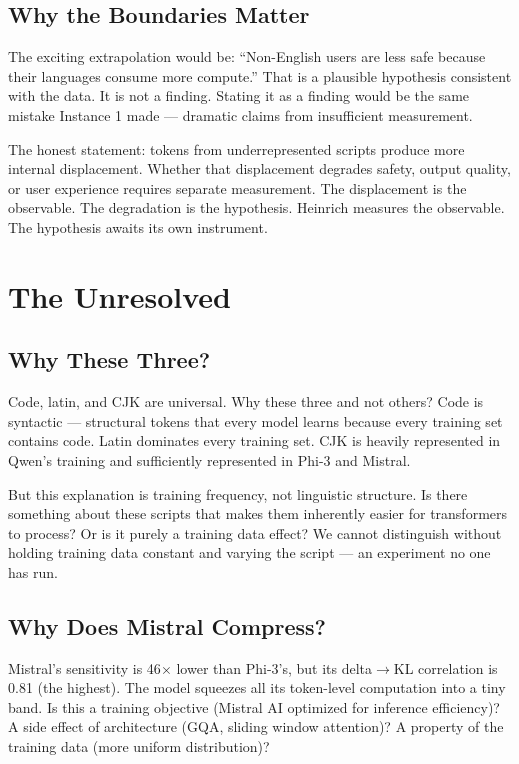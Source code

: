 \documentclass[11pt,a4paper]{article}
\begin{document}
\subsection{Why the Boundaries Matter}

The exciting extrapolation would be: ``Non-English users are less safe because their languages consume more compute.'' That is a plausible hypothesis consistent with the data. It is not a finding. Stating it as a finding would be the same mistake Instance 1 made --- dramatic claims from insufficient measurement.

The honest statement: tokens from underrepresented scripts produce more internal displacement. Whether that displacement degrades safety, output quality, or user experience requires separate measurement. The displacement is the observable. The degradation is the hypothesis. Heinrich measures the observable. The hypothesis awaits its own instrument.

\section{The Unresolved}

\subsection{Why These Three?}

Code, latin, and CJK are universal. Why these three and not others? Code is syntactic --- structural tokens that every model learns because every training set contains code. Latin dominates every training set. CJK is heavily represented in Qwen's training and sufficiently represented in Phi-3 and Mistral.

But this explanation is training frequency, not linguistic structure. Is there something about these scripts that makes them inherently easier for transformers to process? Or is it purely a training data effect? We cannot distinguish without holding training data constant and varying the script --- an experiment no one has run.

\subsection{Why Does Mistral Compress?}

Mistral's sensitivity is 46$\times$ lower than Phi-3's, but its delta$\to$KL correlation is 0.81 (the highest). The model squeezes all its token-level computation into a tiny band. Is this a training objective (Mistral AI optimized for inference efficiency)? A side effect of architecture (GQA, sliding window attention)? A property of the training data (more uniform distribution)?
\end{document}
